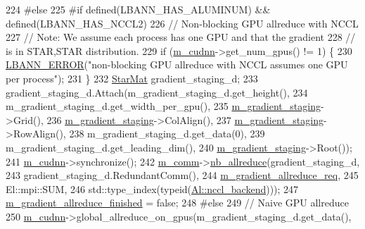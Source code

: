 \begin{DoxyCode}
224 \textcolor{preprocessor}{    #else}
225 \textcolor{preprocessor}{    #if defined(LBANN\_HAS\_ALUMINUM) && defined(LBANN\_HAS\_NCCL2)}
226     \textcolor{comment}{// Non-blocking GPU allreduce with NCCL}
227     \textcolor{comment}{// Note: We assume each process has one GPU and that the gradient}
228     \textcolor{comment}{// is in STAR,STAR distribution.}
229     \textcolor{keywordflow}{if} (\hyperlink{classlbann_1_1optimizer_a2f24dbeaca18b06f4aa7d179bbf96680}{m\_cudnn}->get\_num\_gpus() != 1) \{
230       \hyperlink{base_8hpp_a80b1d707117e968a6951b7222e4b2b87}{LBANN\_ERROR}(\textcolor{stringliteral}{"non-blocking GPU allreduce with NCCL assumes one GPU per process"});
231     \}
232     \hyperlink{base_8hpp_aba08580d21767b53d0737e115d738dbe}{StarMat} gradient\_staging\_d;
233     gradient\_staging\_d.Attach(m\_gradient\_staging\_d.get\_height(),
234                               m\_gradient\_staging\_d.get\_width\_per\_gpu(),
235                               \hyperlink{classlbann_1_1optimizer_a92cd058d4f9fc8162d36d52461a96df2}{m\_gradient\_staging}->Grid(),
236                               \hyperlink{classlbann_1_1optimizer_a92cd058d4f9fc8162d36d52461a96df2}{m\_gradient\_staging}->ColAlign(),
237                               \hyperlink{classlbann_1_1optimizer_a92cd058d4f9fc8162d36d52461a96df2}{m\_gradient\_staging}->RowAlign(),
238                               m\_gradient\_staging\_d.get\_data(0),
239                               m\_gradient\_staging\_d.get\_leading\_dim(),
240                               \hyperlink{classlbann_1_1optimizer_a92cd058d4f9fc8162d36d52461a96df2}{m\_gradient\_staging}->Root());
241     \hyperlink{classlbann_1_1optimizer_a2f24dbeaca18b06f4aa7d179bbf96680}{m\_cudnn}->synchronize();
242     \hyperlink{classlbann_1_1optimizer_a8c2569a8fcf0ee969517067b81896c44}{m\_comm}->\hyperlink{classlbann_1_1lbann__comm_a2a7bb6cf3707366fc0671d8894ca30ea}{nb\_allreduce}(gradient\_staging\_d,
243                          gradient\_staging\_d.RedundantComm(),
244                          \hyperlink{classlbann_1_1optimizer_a851681b39c34a3439a9838c07e84b87c}{m\_gradient\_allreduce\_req},
245                          El::mpi::SUM,
246                          std::type\_index(\textcolor{keyword}{typeid}(\hyperlink{namespacelbann_1_1Al_acac3d42323b313e89a60a27f00554661}{Al::nccl\_backend})));
247     \hyperlink{classlbann_1_1optimizer_a4d332551d05e245ad3f862653b5af65a}{m\_gradient\_allreduce\_finished} = \textcolor{keyword}{false};
248 \textcolor{preprocessor}{    #else}
249     \textcolor{comment}{// Naive GPU allreduce}
250     \hyperlink{classlbann_1_1optimizer_a2f24dbeaca18b06f4aa7d179bbf96680}{m\_cudnn}->global\_allreduce\_on\_gpus(m\_gradient\_staging\_d.get\_data(),

\end{DoxyCode}
